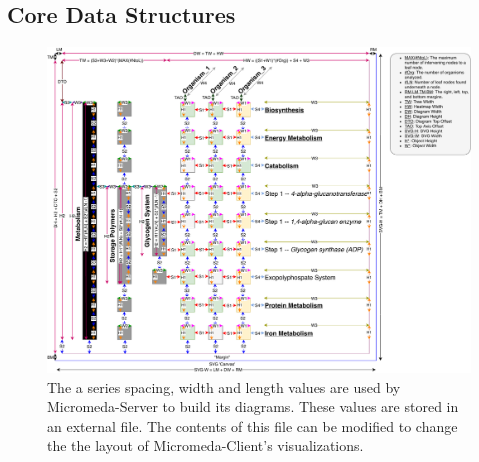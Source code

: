 \subsection{Core Data Structures}

\begin{figure}[!ht]
  \centering
	\includegraphics[width=\textwidth]{media/diagram_measurements.pdf}
	 \caption{The a series spacing, width and length values are used by Micromeda-Server to build its diagrams. These values are stored in an external file. The contents of this file can be modified to change the the layout of Micromeda-Client's visualizations.}
	 \label{fig:visualization-philosphy}
\end{figure}

